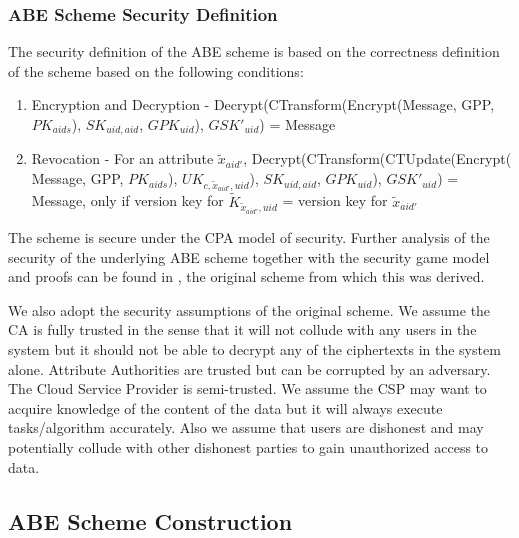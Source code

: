 \subsubsection{ABE Scheme Security Definition}\label{secdef}

The security definition of the ABE scheme is based on the correctness definition of the scheme based on the following conditions:

\begin{enumerate}[label=(\arabic*)]
	\item Encryption and Decryption - Decrypt(CTransform(Encrypt(Message, GPP, $PK_{aids}$), $SK_{uid,aid}$, $GPK_{uid}$), $GSK'_{uid}$) = Message
	
	\item Revocation - For an attribute $\tilde{x}_{aid'}$, Decrypt(CTransform(CTUpdate(Encrypt(\\Message, GPP, $PK_{aids}$), ${UK}_{c,\tilde{x}_{aid'},uid}$), $SK_{uid,aid}$, $GPK_{uid}$), $GSK'_{uid}$) = Message, only if version key for $\tilde{K}_{\tilde{x}_{aid'},uid}$ = version key for $\tilde{x}_{aid'}$
\end{enumerate}

The scheme is secure under the CPA model of security. Further analysis of the security of the underlying ABE scheme together with the security game model and proofs can be found in \cite{Yang2014}, the original scheme from which this was derived.

We also adopt the security assumptions of the original  scheme\cite{Yang2014}. We assume the CA is fully trusted in the sense that it will not collude with any users in the system but it should not be able to decrypt any of the ciphertexts in the system alone. Attribute Authorities are trusted but can be corrupted by an adversary. The Cloud Service Provider is semi-trusted. We assume the CSP may want to acquire knowledge of the content of the data but it will always execute tasks/algorithm accurately. Also we assume that users are dishonest and may potentially collude with other dishonest parties to gain unauthorized access to data.


\subsection{ABE Scheme Construction}

